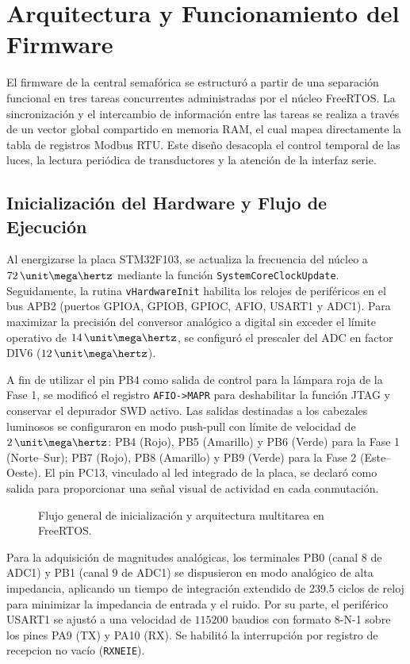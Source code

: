 \chapter{Arquitectura y Funcionamiento del Firmware}
\label{sec:firmware}

El firmware de la central semafórica se estructuró a partir de una separación funcional en tres tareas concurrentes
administradas por el núcleo FreeRTOS. La sincronización y el intercambio de información entre las tareas se realiza
a través de un vector global compartido en memoria RAM, el cual mapea directamente la tabla de registros Modbus RTU.
Este diseño desacopla el control temporal de las luces, la lectura periódica de transductores y la atención de la
interfaz serie.

\section{Inicialización del Hardware y Flujo de Ejecución}
\label{sec:hw_init}

Al energizarse la placa STM32F103, se actualiza la frecuencia del núcleo a $72\MHz$ mediante la función
\texttt{SystemCoreClockUpdate}. Seguidamente, la rutina \texttt{vHardwareInit} habilita los relojes de periféricos
en el bus APB2 (puertos GPIOA, GPIOB, GPIOC, AFIO, USART1 y ADC1). Para maximizar la precisión del conversor analógico
a digital sin exceder el límite operativo de $14\MHz$, se configuró el prescaler del ADC en factor DIV6 ($12\MHz$).

A fin de utilizar el pin PB4 como salida de control para la lámpara roja de la Fase 1, se modificó el registro
\texttt{AFIO->MAPR} para deshabilitar la función JTAG y conservar el depurador SWD activo. Las salidas destinadas a
los cabezales luminosos se configuraron en modo push-pull con límite de velocidad de $2\MHz$: PB4 (Rojo), PB5
(Amarillo) y PB6 (Verde) para la Fase 1 (Norte--Sur); PB7 (Rojo), PB8 (Amarillo) y PB9 (Verde) para la Fase 2
(Este--Oeste). El pin PC13, vinculado al led integrado de la placa, se declaró como salida para proporcionar una señal
visual de actividad en cada conmutación.

\begin{figure}[!ht]
  \centering
  \resizebox{\textwidth}{!}{}
  \caption{Flujo general de inicialización y arquitectura multitarea en FreeRTOS.}
  \label{fig:flujo_firmware}
\end{figure}

Para la adquisición de magnitudes analógicas, los terminales PB0 (canal 8 de ADC1) y PB1 (canal 9 de ADC1) se
dispusieron en modo analógico de alta impedancia, aplicando un tiempo de integración extendido de 239.5 ciclos de
reloj para minimizar la impedancia de entrada y el ruido. Por su parte, el periférico USART1 se ajustó a una velocidad
de $115200$ baudios con formato 8-N-1 sobre los pines PA9 (TX) y PA10 (RX). Se habilitó la interrupción por registro de
recepcion no vacío (\texttt{RXNEIE}).

